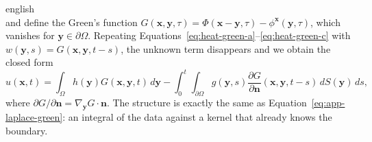 \documentclass[../0000.tex]{subfiles}
\begin{document}
\begin{hyphenrules}{english}
\begin{equation}
  \label{eq:heat-corrector}
\end{equation}
and define the Green's function $G(\mathbf{x},\mathbf{y},\tau)=\Phi(\mathbf{x}-\mathbf{y},\tau)-\phi^{\mathbf{x}}(\mathbf{y},\tau)$, which vanishes for
$\mathbf{y}\in\partial\Omega$. Repeating Equations~\eqref{eq:heat-green-a}--\eqref{eq:heat-green-c} with
$w(\mathbf{y},s)=G(\mathbf{x},\mathbf{y},t-s)$, the unknown term disappears and we obtain the closed form
\begin{equation}
  u(\mathbf{x},t)=\int_\Omega h(\mathbf{y})G(\mathbf{x},\mathbf{y},t)\,d\mathbf{y}
  -\int_0^t\!\!\int_{\partial\Omega}g(\mathbf{y},s)\frac{\partial G}{\partial\mathbf{n}}(\mathbf{x},\mathbf{y},t-s)\,d S(\mathbf{y})\,d s,
  \label{eq:app-heat-green}
\end{equation}
where $\partial G/\partial\mathbf{n}=\nabla_{\mathbf{y}}G\cdot\mathbf{n}$. The structure is exactly the same as
Equation~\eqref{eq:app-laplace-green}: an integral of the data against a kernel that already knows the boundary.


\end{hyphenrules}
\end{document}

